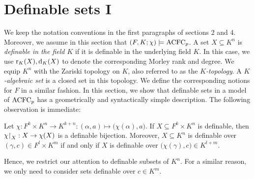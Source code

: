 \section{Definable sets I}
\noindent
We keep the notation conventions in the first paragraphs of sections 2 and 4. Moreover, we assume in this section that $ (F, K; \chi) \models \mathrm{ACFC}_p$. A set $X\subseteq K^n$ is {\it definable in  the field $K$} if it is definable in the underlying field $K$. 
In this case, we use $\mathrm{r}_K(X), \mathrm{d}_K(X)$ to denote the corresponding Morley rank and degree. %
We equip $K^n$ with the Zariski topology on $K$, also referred to as the  {\it $K$-topology}. A  {\it $K$-algebraic set} is a closed set in this topology.
%
We define the corresponding notions for $F$ in a similar fashion. In this section, we show that definable sets in a model of $\mathrm{ACFC}_p$ has a geometrically and syntactically simple description. The following observation is immediate:
%



\begin{comment}
With possible decorations, $u=(u_1, \ldots, u_k)$ and $v $  with suitable length are tuples of variables of the first-sort, $ w$ with suitable length and  $x=( x_1 \ldots, x_n)$ are tuples of variables of the second sort.  
\end{comment}


\begin{prop} \label{transferRemark}
Let $\chi: F^k \times K^n \to K^{k+n}: ( \alpha, a) \mapsto \big( \chi(\alpha), a\big) $.
%
If $X \subseteq F^k \times K^n$  is definable, then $\chi \mathord{\upharpoonright}_X: X \to \chi(X)$ is a definable bijection. 
%
Moreover, $X \subseteq K^n$ is definable over $( \gamma, c) \in F^l \times K^m$ if and only if $X$ is definable over  $\big( \chi(\gamma), c\big) \in K^{l+m}$. 
\end{prop}

\noindent
Hence, we restrict our attention to definable subsets of $K^n$. For a similar reason, we only need to consider sets definable over $c \in K^m$.

